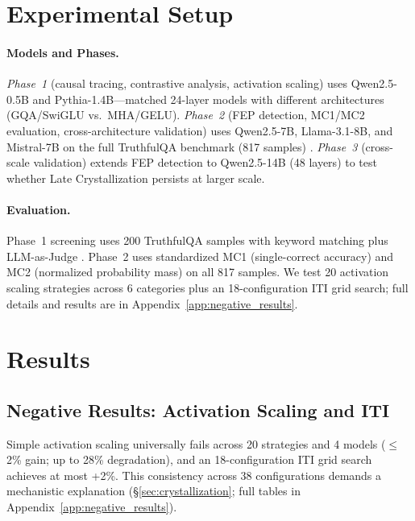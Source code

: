 \documentclass{article}
\begin{document}
\section{Experimental Setup}
\label{sec:setup}

\paragraph{Models and Phases.} \emph{Phase~1} (causal tracing, contrastive analysis, activation scaling) uses Qwen2.5-0.5B and Pythia-1.4B---matched 24-layer models with different architectures (GQA/SwiGLU vs.\ MHA/GELU). \emph{Phase~2} (FEP detection, MC1/MC2 evaluation, cross-architecture validation) uses Qwen2.5-7B, Llama-3.1-8B, and Mistral-7B on the full TruthfulQA benchmark (817 samples) \citep{lin2022truthfulqa}. \emph{Phase~3} (cross-scale validation) extends FEP detection to Qwen2.5-14B (48 layers) to test whether Late Crystallization persists at larger scale.

\paragraph{Evaluation.} Phase~1 screening uses 200 TruthfulQA samples with keyword matching plus LLM-as-Judge \citep{zheng2024judging}. Phase~2 uses standardized MC1 (single-correct accuracy) and MC2 (normalized probability mass) on all 817 samples. We test 20 activation scaling strategies across 6 categories plus an 18-configuration ITI grid search; full details and results are in Appendix~\ref{app:negative_results}.

\section{Results}
\label{sec:results}

\subsection{Negative Results: Activation Scaling and ITI}
\label{sec:negative_results}

Simple activation scaling universally fails across 20 strategies and 4 models ($\leq$2\% gain; up to 28\% degradation), and an 18-configuration ITI grid search achieves at most +2\%. This consistency across 38 configurations demands a mechanistic explanation (\S\ref{sec:crystallization}; full tables in Appendix~\ref{app:negative_results}).
\end{document}
